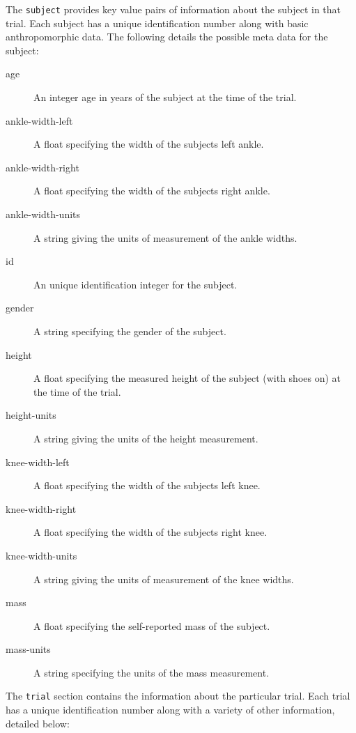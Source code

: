 \documentclass[10pt,a4paper,twocolumn]{article}
\begin{document}
The \verb+subject+ provides key value pairs of information about the subject in
that trial. Each subject has a unique identification number along with basic
anthropomorphic data. The following details the possible meta data for the
subject:

\begin{description}
  \item[age] An integer age in years of the subject at the time of the trial.
  \item[ankle-width-left] A float specifying the width of the subjects left
    ankle.
  \item[ankle-width-right] A float specifying the width of the subjects right
    ankle.
  \item[ankle-width-units] A string giving the units of measurement of the
    ankle widths.
  \item[id] An unique identification integer for the subject.
  \item[gender] A string specifying the gender of the subject.
  \item[height] A float specifying the measured height of the subject (with
    shoes on) at the time of the trial.
  \item[height-units] A string giving the units of the height measurement.
  \item[knee-width-left] A float specifying the width of the subjects left
    knee.
  \item[knee-width-right] A float specifying the width of the subjects right
    knee.
  \item[knee-width-units] A string giving the units of measurement of the
    knee widths.
  \item[mass] A float specifying the self-reported mass of the subject.
  \item[mass-units] A string specifying the units of the mass measurement.
\end{description}

The \verb+trial+ section contains the information about the particular trial.
Each trial has a unique identification number along with a variety of other
information, detailed below:
\end{document}
